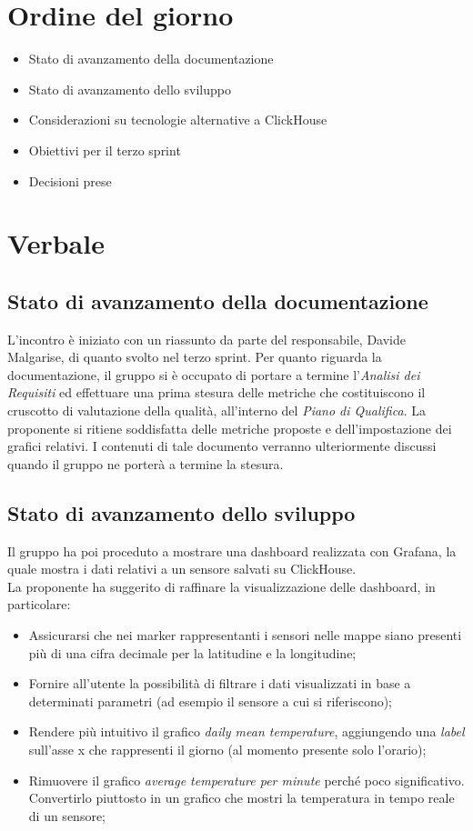 \documentclass[italian,12pt]{article}
\begin{document}
\section{Ordine del giorno}
\begin{itemize}
	\item Stato di avanzamento della documentazione
	\item Stato di avanzamento dello sviluppo
	\item Considerazioni su tecnologie alternative a ClickHouse
	\item Obiettivi per il terzo sprint
	\item Decisioni prese
\end{itemize}

\newpage

\section{Verbale}

\subsection{Stato di avanzamento della documentazione}
L'incontro è iniziato con un riassunto da parte del responsabile, Davide Malgarise, di quanto svolto nel terzo sprint.
Per quanto riguarda la documentazione, il gruppo si è occupato di portare a termine l'\textit{Analisi dei Requisiti}
ed effettuare una prima stesura delle metriche che costituiscono il cruscotto di valutazione della qualità, all'interno del \textit{Piano di Qualifica}.
La proponente si ritiene soddisfatta delle metriche proposte e dell'impostazione dei grafici relativi.
I contenuti di tale documento verranno ulteriormente discussi quando il gruppo ne porterà a termine la stesura.

\subsection{Stato di avanzamento dello sviluppo}
Il gruppo ha poi proceduto a mostrare una dashboard realizzata con Grafana, la quale mostra i dati relativi a
un sensore salvati su ClickHouse.\\
La proponente ha suggerito di raffinare la visualizzazione delle dashboard, in particolare:
\begin{itemize}
	\label{item:consigli}
	\item Assicurarsi che nei marker rappresentanti i sensori nelle mappe siano presenti più di una cifra decimale per la latitudine e la longitudine;
	\item Fornire all'utente la possibilità di filtrare i dati visualizzati in base a determinati parametri (ad esempio il sensore a cui si riferiscono);
	\item Rendere più intuitivo il grafico \textit{daily mean temperature}, aggiungendo una \textit{label} sull'asse x che rappresenti il giorno (al momento presente solo l'orario);
	\item Rimuovere il grafico \textit{average temperature per minute} perché poco significativo. Convertirlo piuttosto in un grafico che mostri la temperatura in tempo reale di un sensore;
\end{itemize}
\end{document}
